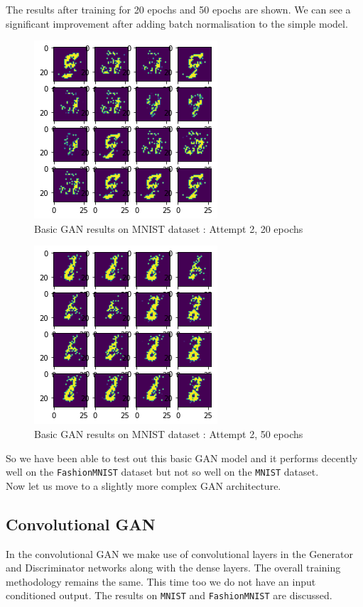 \documentclass[conference]{IEEEtran}
\begin{document}
\begin{itemize}
    The results after training for 20 epochs and 50 epochs are shown. We can see a significant improvement after adding batch normalisation to the simple model.
     \begin{figure}[h]
    \centering
    \includegraphics[scale = 0.6]{2nd_attempt_mnist_20epoc.png}
      \caption{Basic GAN results on MNIST dataset : Attempt 2, 20 epochs}
    \end{figure}
     \begin{figure}[h]
    \centering
    \includegraphics[scale = 0.6]{2nd_attempt_mnist_50epoc.png}
      \caption{Basic GAN results on MNIST dataset : Attempt 2, 50 epochs}
    \end{figure}
\end{itemize}

So we have been able to test out this basic GAN model and it performs decently well on the \texttt{FashionMNIST} dataset but not so well on the \texttt{MNIST} dataset.\\
Now let us move to a slightly more complex GAN architecture.

\subsection{Convolutional GAN}
In the convolutional GAN we make use of convolutional layers in the Generator and Discriminator networks along with the dense layers. The overall training methodology remains the same. This time too we do not have an input conditioned output. The results on \texttt{MNIST} and \texttt{FashionMNIST} are discussed.\\
\end{document}

